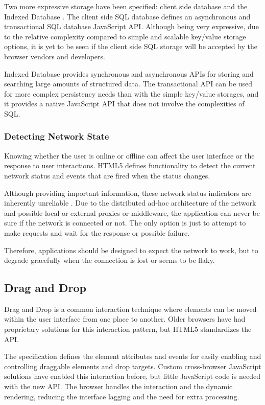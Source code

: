 Two more expressive storage  have been specified: client
side  database \cite{webstoragedraft} and the Indexed
Database \cite{indexedDBdraft}. The client side SQL database defines
an asynchronous and transactional SQL database JavaScript
API. Although being very expressive, due to the relative complexity
compared to simple and scalable key/value storage options, it is yet
to be seen if the client side SQL storage will be accepted by the
browser vendors and developers.

Indexed Database provides synchronous and asynchronous APIs for
storing and searching large amounts of structured data. The
transactional API can be used for more complex persistency needs than
with the simple key/value storages, and it provides a native
JavaScript API that does not involve the complexities of SQL.

\subsubsection{Detecting Network State}

Knowing whether the user is online or offline can affect the user
interface or the response to user interactions. HTML5 defines
functionality to detect the current network status and events that are
fired when the status changes. \cite{HTML5draft}

Although providing important information, these network status
indicators are inherently unreliable \cite{HTML5draft}. Due to the
distributed ad-hoc architecture of the network and possible local or
external proxies or middleware, the application can never be sure if
the network is connected or not. The only option is just to attempt to
make requests and wait for the response or possible failure.

Therefore, applications should be designed to expect the network to
work, but to degrade gracefully when the connection is lost or seems
to be flaky.

\subsection{Drag and Drop}

Drag and Drop is a common interaction technique where elements can be
moved within the user interface from one place to another. Older
browsers have had proprietary solutions for this interaction pattern,
but HTML5 standardizes the API.

The specification defines the element attributes and  events
for easily enabling and controlling draggable elements and drop
targets. Custom cross-browser JavaScript solutions have enabled this
interaction before, but little JavaScript code is needed with the new
API. The browser handles the interaction and the dynamic rendering,
reducing the interface lagging and the need for extra processing.

